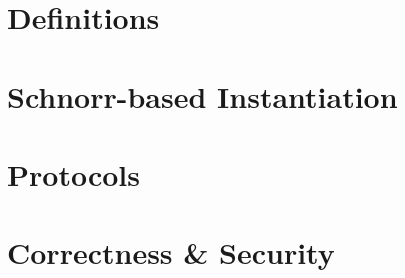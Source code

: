 \section{Definitions} \label{sec:sig:definitions}


\section{Schnorr-based Instantiation} \label{sec:sig:schnorr-inst}


\section{Protocols} \label{sec:sig:protocols}


\section{Correctness \& Security}\label{sec:sig:two-party-apt-security}

